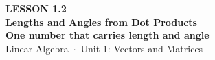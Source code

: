 \documentclass[aspectratio=169, 11pt]{beamer}
\begin{document}
{
\begin{frame}[plain]
  \vspace{2.8cm}\hspace{0.55cm}%
  \begin{minipage}{0.9\textwidth}
    {\color{goldacc}\bfseries\small LESSON 1.2}\\[0.5cm]
    {\color{white}\bfseries\LARGE Lengths and Angles from Dot Products}\\[0.3cm]
    {\color{white}\bfseries\large One number that carries length and angle}\\[1.0cm]
    {\color{blushmid}\small Linear Algebra~$\cdot$~Unit 1: Vectors and Matrices}
  \end{minipage}
\end{frame}
}
\end{document}
